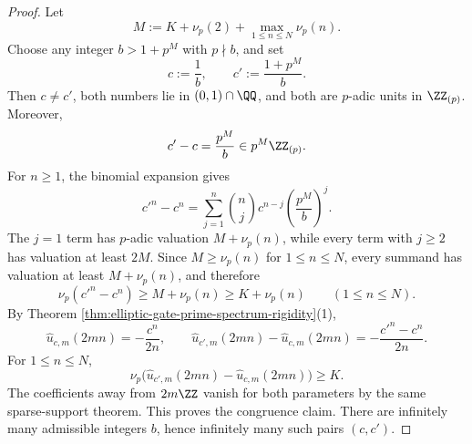 \begin{proof}
Let
\[
M:=K+\nu_p(2)+\max_{1\le n\le N}\nu_p(n).
\]
Choose any integer \(b>1+p^M\) with \(p\nmid b\), and set
\[
c:=\frac{1}{b},
\qquad
c':=\frac{1+p^M}{b}.
\]
Then \(c\neq c'\), both numbers lie in \((0,1)\cap\QQ\), and both are \(p\)-adic units in \(\ZZ_{(p)}\). Moreover,
\[
c'-c=\frac{p^M}{b}\in p^M\ZZ_{(p)}.
\]
For \(n\ge 1\), the binomial expansion gives
\[
c'^n-c^n=\sum_{j=1}^{n}\binom{n}{j}c^{n-j}\left(\frac{p^M}{b}\right)^j.
\]
The \(j=1\) term has \(p\)-adic valuation \(M+\nu_p(n)\), while every term with \(j\ge 2\) has valuation at least \(2M\). Since \(M\ge \nu_p(n)\) for \(1\le n\le N\), every summand has valuation at least \(M+\nu_p(n)\), and therefore
\[
\nu_p(c'^n-c^n)\ge M+\nu_p(n)\ge K+\nu_p(n)
\qquad (1\le n\le N).
\]
By Theorem \ref{thm:elliptic-gate-prime-spectrum-rigidity}(1),
\[
\widehat u_{c,m}(2mn)=-\frac{c^n}{2n},
\qquad
\widehat u_{c',m}(2mn)-\widehat u_{c,m}(2mn)
=-\frac{c'^n-c^n}{2n}.
\]
For \(1\le n\le N\),
\[
\nu_p\!\bigl(\widehat u_{c',m}(2mn)-\widehat u_{c,m}(2mn)\bigr)
\ge K.
\]
The coefficients away from \(2m\ZZ\) vanish for both parameters by the same sparse-support theorem. This proves the congruence claim. There are infinitely many admissible integers \(b\), hence infinitely many such pairs \((c,c')\).
\end{proof}

\endinput
